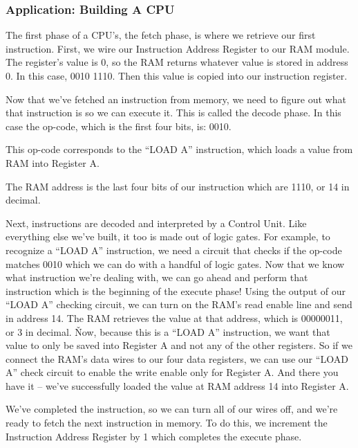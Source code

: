 \subsubsection{Application: Building A CPU}

The first phase of a CPU's, the fetch phase, is where we retrieve our first instruction. First, we wire our
Instruction Address Register to our RAM module. The register's value is 0, so the RAM returns whatever value is
stored in address 0. In this case, 0010 1110. Then this value is copied into our instruction register.


Now that we've fetched an instruction from memory, we need to figure out what that instruction is so we can execute
it. This is called the decode phase. In this case the op-code, which is the first four bits, is: 0010.


This op-code corresponds to the ``LOAD A'' instruction, which loads a value from RAM into Register A.


The RAM address is the last four bits of our instruction which are 1110, or 14 in decimal.


Next, instructions are decoded and interpreted by a Control Unit. Like everything else we've built, it too is made
out of logic gates. For example, to recognize a ``LOAD A'' instruction, we need a circuit that checks if the op-code
matches 0010 which we can do with a handful of logic gates. Now that we know what instruction we're dealing with, we
can go ahead and perform that instruction which is the beginning of the execute phase! Using the output of our ``LOAD
A'' checking circuit, we can turn on the RAM's read enable line and send in address 14. The RAM retrieves the value
at that address, which is 00000011, or 3 in decimal. \v

Now, because this is a ``LOAD A'' instruction, we want that value to only be saved into Register A and not any of the
other registers. So if we connect the RAM's data wires to our four data registers, we can use our ``LOAD A'' check
circuit to enable the write enable only for Register A. And there you have it -- we've successfully loaded the value
at RAM address 14 into Register A.


We've completed the instruction, so we can turn all of our wires off, and we're ready to fetch the next instruction
in memory. To do this, we increment the Instruction Address Register by 1 which completes the execute phase.

